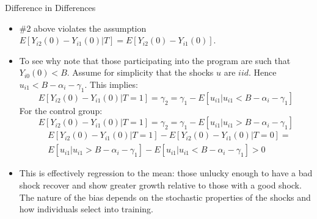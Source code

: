 \documentclass[xcolor=pdftex,dvipsnames,table,mathserif,aspectratio=169]{beamer}
\begin{document}
\begin{frame}{Difference in Differences}
\small
\begin{itemize}
\item  \#2 above violates the assumption {\small $E[Y_{i2}(0) - Y_{i1}(0) | T] = E[Y_{i2}(0) - Y_{i1}(0)]$}. 
\item To see why note that those participating into the program are such
that {\small $Y_{i0}(0) < B$}. Assume for simplicity that the shocks {\small $u$} are {\small $iid$}. Hence {\small $u_{i1} < B- \alpha_i - \gamma_1$}. 
This implies: 
{\small $$E[Y_{i2}(0)- Y_{i1}(0) | T=1] = \gamma_2 = \gamma_1 - E[u_{i1}| u_{i1} <  B-\alpha_i - \gamma_1]$$}
For the control group:
{\small $$E[Y_{i2}(0) - Y_{i1}(0) | T=1] = \gamma_2 = \gamma_1 - E[u_{i1}| u_{i1} >  B-\alpha_i - \gamma_1]$$}
\vspace{-1cm}
\begin{align*}
& E[Y_{i2}(0) - Y_{i1}(0) | T=1] - E[Y_{i2}(0) - Y_{i1}(0) | T=0] =\\
&  E[u_{i1} | u_{i1} >  B-\alpha_i - \gamma_1] - E[u_{i1} | u_{i1} < B-\alpha_i - \gamma_1]  >0
  \end{align*}
 \item This is effectively regression to the mean: those unlucky enough to have a bad shock recover and show greater growth relative to those with a good shock. The nature of the bias depends on the stochastic properties of the shocks and how individuals select into training.
\end{itemize}
\end{frame} 

%
\end{document}
